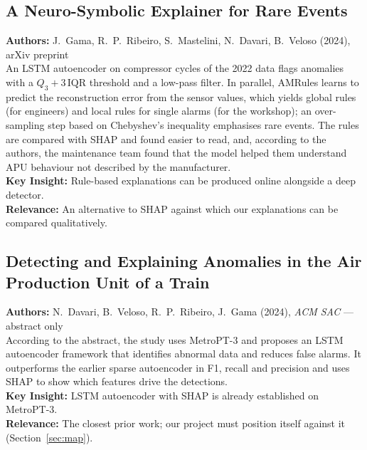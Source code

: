 \subsection[Gama et al. (2024): Neuro-Symbolic Explainer for Rare Events]{A Neuro-Symbolic Explainer for Rare Events}
\textbf{Authors:} J.~Gama, R.~P.~Ribeiro, S.~Mastelini, N.~Davari, B.~Veloso (2024), arXiv preprint \cite{gama2024neurosymbolic}\\
An LSTM autoencoder on compressor cycles of the 2022 data flags anomalies with a $Q_3 + 3\,\mathrm{IQR}$ threshold and a low-pass filter. In parallel, AMRules learns to predict the reconstruction error from the sensor values, which yields global rules (for engineers) and local rules for single alarms (for the workshop); an over-sampling step based on Chebyshev's inequality emphasises rare events. The rules are compared with SHAP and found easier to read, and, according to the authors, the maintenance team found that the model helped them understand APU behaviour not described by the manufacturer.\\
\textbf{Key Insight:} Rule-based explanations can be produced online alongside a deep detector.\\
\textbf{Relevance:} An alternative to SHAP against which our explanations can be compared qualitatively.

\subsection[Davari et al. (2024): Detecting and Explaining APU Anomalies]{Detecting and Explaining Anomalies in the Air Production Unit of a Train}
\textbf{Authors:} N.~Davari, B.~Veloso, R.~P.~Ribeiro, J.~Gama (2024), \textit{ACM SAC} \cite{davari2024explaining} --- abstract only\\
According to the abstract, the study uses MetroPT-3 and proposes an LSTM autoencoder framework that identifies abnormal data and reduces false alarms. It outperforms the earlier sparse autoencoder in F1, recall and precision and uses SHAP to show which features drive the detections.\\
\textbf{Key Insight:} LSTM autoencoder with SHAP is already established on MetroPT-3.\\
\textbf{Relevance:} The closest prior work; our project must position itself against it (Section~\ref{sec:map}).

